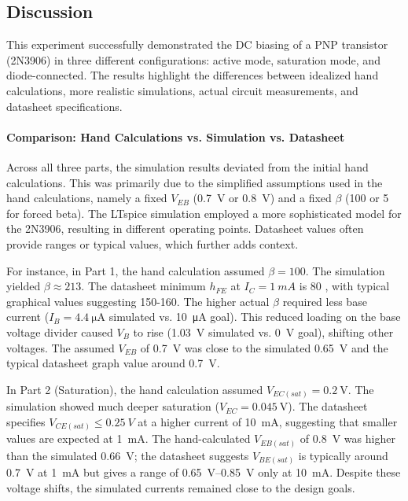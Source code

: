 \documentclass[12pt]{article}
\begin{document}
\subsection{Discussion}
This experiment successfully demonstrated the DC biasing of a PNP transistor (2N3906) in three different configurations: active mode, saturation mode, and diode-connected. The results highlight the differences between idealized hand calculations, more realistic simulations, actual circuit measurements, and datasheet specifications.

\paragraph{Comparison: Hand Calculations vs. Simulation vs. Datasheet}
Across all three parts, the simulation results deviated from the initial hand calculations. This was primarily due to the simplified assumptions used in the hand calculations, namely a fixed $V_{EB}$ (\SI{0.7}{\volt} or \SI{0.8}{\volt}) and a fixed $\beta$ (100 or 5 for forced beta). The LTspice simulation employed a more sophisticated model for the 2N3906, resulting in different operating points. Datasheet values often provide ranges or typical values, which further adds context.

For instance, in Part 1, the hand calculation assumed $\beta=100$. The simulation yielded $\beta \approx 213$. The datasheet minimum $h_{FE}$ at $I_C = \SI{1}{mA}$ is 80 , with typical graphical values suggesting 150-160. The higher actual $\beta$ required less base current ($I_B = \SI{4.4}{\micro\ampere}$ simulated vs. \SI{10}{\micro\ampere} goal). This reduced loading on the base voltage divider caused $V_B$ to rise (\SI{1.03}{\volt} simulated vs. \SI{0}{\volt} goal), shifting other voltages. The assumed $V_{EB}$ of \SI{0.7}{\volt} was close to the simulated \SI{0.65}{\volt} and the typical datasheet graph value around \SI{0.7}{\volt}.

In Part 2 (Saturation), the hand calculation assumed $V_{EC(sat)} = \SI{0.2}{\volt}$. The simulation showed much deeper saturation ($V_{EC} = \SI{0.045}{\volt}$). The datasheet specifies $V_{CE(sat)} \le \SI{0.25}{V}$ at a higher current of \SI{10}{mA}, suggesting that smaller values are expected at \SI{1}{mA}. The hand-calculated $V_{EB(sat)}$ of \SI{0.8}{\volt} was higher than the simulated \SI{0.66}{\volt}; the datasheet suggests $V_{BE(sat)}$ is typically around \SI{0.7}{\volt} at \SI{1}{mA}  but gives a range of \SIrange{0.65}{0.85}{V} only at \SI{10}{mA}. Despite these voltage shifts, the simulated currents remained close to the design goals.
\end{document}
